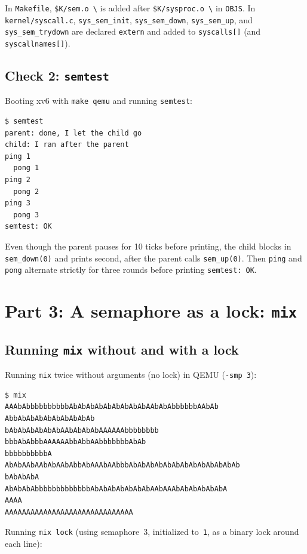 \documentclass{../latex/utmreport}
\begin{document}
In \texttt{Makefile}, \texttt{\$K/sem.o \textbackslash} is added after \texttt{\$K/sysproc.o \textbackslash} in \texttt{OBJS}. In \texttt{kernel/syscall.c}, \texttt{sys\_sem\_init}, \texttt{sys\_sem\_down}, \texttt{sys\_sem\_up}, and \texttt{sys\_sem\_trydown} are declared \texttt{extern} and added to \texttt{syscalls[]} (and \texttt{syscallnames[]}).

\section{Check 2: \texttt{semtest}}

Booting xv6 with \texttt{make qemu} and running \texttt{semtest}:

\begin{lstlisting}
$ semtest
parent: done, I let the child go
child: I ran after the parent
ping 1
  pong 1
ping 2
  pong 2
ping 3
  pong 3
semtest: OK
\end{lstlisting}

Even though the parent pauses for 10 ticks before printing, the child blocks in \texttt{sem\_down(0)} and prints second, after the parent calls \texttt{sem\_up(0)}. Then \texttt{ping} and \texttt{pong} alternate strictly for three rounds before printing \texttt{semtest: OK}.

\chapter{Part 3: A semaphore as a lock: \texttt{mix}}

\section{Running \texttt{mix} without and with a lock}

Running \texttt{mix} twice without arguments (no lock) in QEMU (\texttt{-smp 3}):

\begin{lstlisting}
$ mix
AAAbAbbbbbbbbbbAbAbAbAbAbAbAbAbAbAAbAbAbbbbbbAAbAb
AbbAbAbAbAbAbAbAbAbAb
bAbAbAbAbAbAbAAbAbAbAbAAAAAAbbbbbbbb
bbbAbAbbbAAAAAAbbAbbAAbbbbbbbAbAb
bbbbbbbbbbA
AbAbAAbAAbAbAAbAbbAbAAAbAAbbbAbAbAbAbAbAbAbAbAbAbAbAbAb
bAbAbAbA
AbAbAbAbbbbbbbbbbbbbAbAbAbAbAbAbAbAAbAAAbAbAbAbAbAbA
AAAA
AAAAAAAAAAAAAAAAAAAAAAAAAAAAAA
\end{lstlisting}

Running \texttt{mix lock} (using semaphore~3, initialized to~\texttt{1}, as a binary lock around each line):
\end{document}
